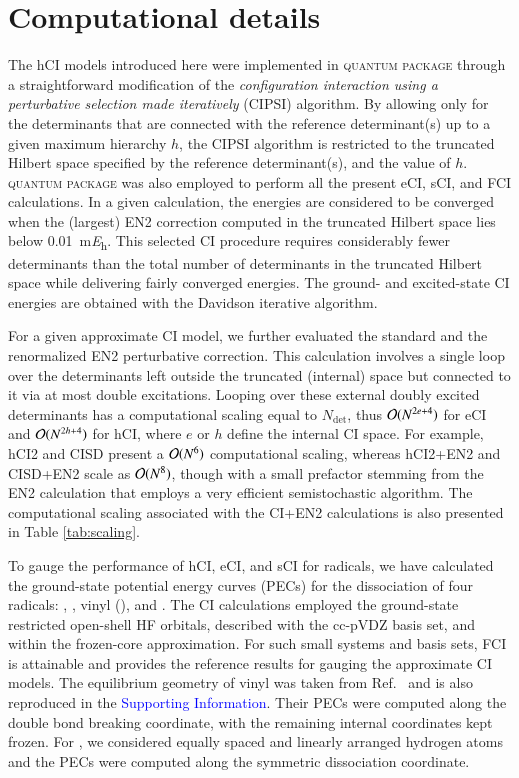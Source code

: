 \documentclass[aip,jcp,reprint,noshowkeys,superscriptaddress]{revtex4-1}
\newcommand{\SupInf}{\textcolor{blue}{Supporting Information}}
\newcommand{\QP}{\textsc{quantum package}}
\newcommand{\Ndet}{N_\text{det}}
\begin{document}
\section{Computational details}
\label{sec:compdet}

The hCI models introduced here were implemented in {\QP} \cite{Garniron_2019} through a straightforward modification of the
\textit{configuration interaction using a perturbative selection made iteratively} (CIPSI) algorithm. \cite{Huron_1973,Giner_2013,Giner_2015,Garniron_2018}
By allowing only for the determinants that are connected with the reference determinant(s) up to a given maximum hierarchy $h$,
the CIPSI algorithm is restricted to the truncated Hilbert space specified by the reference determinant(s), and the value of $h$.
{\QP} \cite{Garniron_2019} was also employed to perform all the present eCI, sCI, and FCI calculations.
In a given calculation, the energies are considered to be converged when the (largest) EN2 correction computed in the truncated Hilbert space
lies below \SI{0.01}{\milli\hartree}. \cite{Garniron_2018}
This selected CI procedure requires considerably fewer determinants than the total number of determinants in the truncated Hilbert space
while delivering fairly converged energies.
The ground- and excited-state CI energies are obtained with the Davidson iterative algorithm. \cite{Davidson_1975}

For a given approximate CI model, we further evaluated the standard and the renormalized EN2 perturbative correction. \cite{Garniron_2019}
This calculation involves a single loop over the determinants left outside the truncated (internal) space but connected to it via at most double excitations.
Looping over these external doubly excited determinants has a computational scaling equal to $\Ndet$,
thus $\order*{N^{2e+4}}$ for eCI and $\order*{N^{2h+4}}$ for hCI, where $e$ or $h$ define the internal CI space.
For example, hCI2 and CISD present a $\order*{N^6}$ computational scaling, whereas hCI2+EN2 and CISD+EN2 scale as $\order*{N^8}$,
though with a small prefactor stemming from the EN2 calculation that employs a very efficient semistochastic algorithm. \cite{Garniron_2018}
The computational scaling associated with the CI+EN2 calculations is also presented in Table \ref{tab:scaling}.

To gauge the performance of hCI, eCI, and sCI for radicals, we have calculated the ground-state potential energy curves (PECs) for the dissociation of four radicals:
, , vinyl (), and .
The CI calculations employed the ground-state restricted open-shell HF orbitals, described with the cc-pVDZ basis set, and within the frozen-core approximation.
For such small systems and basis sets, FCI is attainable and provides the reference results for gauging the approximate CI models.
The equilibrium geometry of vinyl was taken from Ref.~ and is also reproduced in the {\SupInf}.
Their PECs were computed along the  double bond breaking coordinate, with the remaining internal coordinates kept frozen.
For , we considered equally spaced and linearly arranged hydrogen atoms and the PECs were computed along the symmetric dissociation coordinate.
\end{document}
